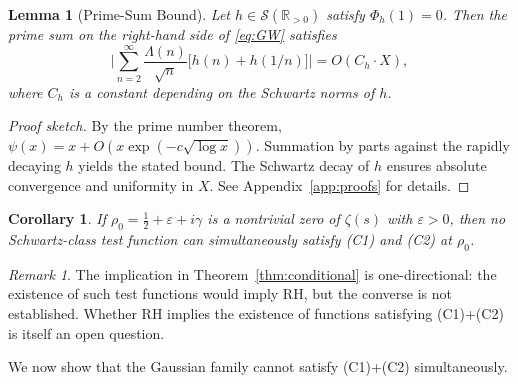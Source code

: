 \documentclass[12pt]{article}
\newtheorem{lemma}[theorem]{Lemma}
\newtheorem{corollary}[theorem]{Corollary}
\theoremstyle{remark}
\newtheorem{remark}[theorem]{Remark}
\begin{document}
\begin{lemma}[Prime-Sum Bound]\label{lem:prime_bound}
Let $h \in \mathcal{S}(\mathbb{R}_{>0})$ satisfy $\Phi_h(1) = 0$.
Then the prime sum on the right-hand side of \eqref{eq:GW} satisfies
\[
\Biggl|\sum_{n=2}^{\infty} \frac{\Lambda(n)}{\sqrt{n}}
  \bigl[h(n) + h(1/n)\bigr]\Biggr|
= O(C_h \cdot X),
\]
where $C_h$ is a constant depending on the Schwartz norms of $h$.
\end{lemma}

\begin{proof}[Proof sketch]
By the prime number theorem, $\psi(x) = x + O(x\exp(-c\sqrt{\log x}))$.
Summation by parts against the rapidly decaying $h$ yields the stated bound.
The Schwartz decay of $h$ ensures absolute convergence and uniformity in $X$.
See Appendix~\ref{app:proofs} for details.
\end{proof}

\begin{corollary}\label{cor:oneway}
If $\rho_0 = \tfrac{1}{2}+\varepsilon+i\gamma$ is a nontrivial zero of
$\zeta(s)$ with $\varepsilon > 0$, then no Schwartz-class test function
can simultaneously satisfy \textup{(C1)} and \textup{(C2)} at $\rho_0$.
\end{corollary}

\begin{remark}
The implication in Theorem~\ref{thm:conditional} is one-directional:
the existence of such test functions would imply RH, but the converse
is not established. Whether RH implies the existence of functions
satisfying (C1)+(C2) is itself an open question.
\end{remark}

\medskip

We now show that the Gaussian family cannot satisfy (C1)+(C2) simultaneously.
\end{document}
